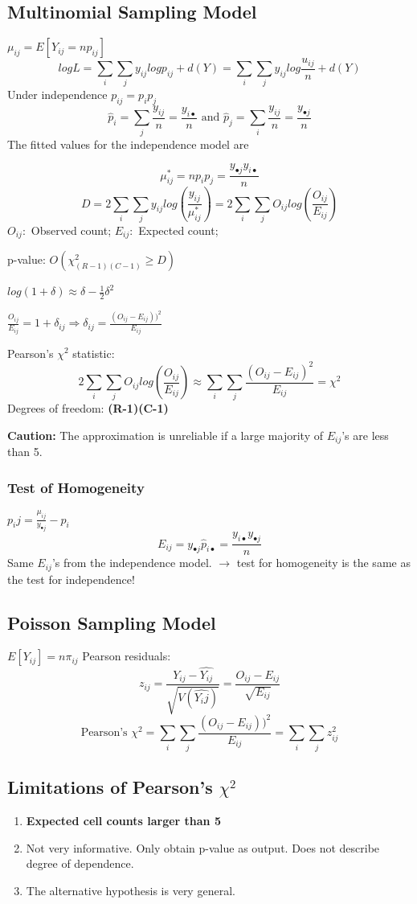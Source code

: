 \documentclass[10pt,landscape, fleqn]{article}
\begin{document}
\begin{multicols}{3}
			\subsection{Multinomial Sampling Model}
				$\mu_{ij} = E[Y_{ij} = np_{ij}]$
				\[ logL = \sum_{i}\sum_{j}y_{ij}log p_{ij} + d(Y) = \sum_{i}\sum_{j}y_{ij}log \frac{u_{ij}}{n} + d(Y)\]
				Under independence $p_{ij} = p_ip_j$
				\[\hat{p}_i = \sum_{j}\frac{y_{ij}}{n} = \frac{y_{i\bullet}}{n} \mbox{ and } \hat{p}_j = \sum_{i}\frac{y_{ij}}{n} = \frac{y_{\bullet j}}{n} \]
				The fitted values for the independence model are \par
				\[ \mu^*_{ij} = np_ip_j = \frac{y_{\bullet j}y_{i\bullet}}{n} \]
				\[ D = 2\sum_{i}\sum_{j}y_{ij}log(\frac{y_{ij}}{\mu^*_{ij}}) = 2\sum_{i}\sum_{j}O_{ij}log(\frac{O_{ij}}{E_{ij}}) \]
				$O_{ij}: $ Observed count; $E_{ij}: $ Expected count; \par 
				p-value: $O(\chi^2_{(R-1)(C-1)} \geq D)$ \par 
				$log(1+\delta) \approx \delta- \frac{1}{2}\delta^2$ \par 
				$\frac{O_{ij}}{E_{ij}} = 1 + \delta_{ij} \Rightarrow \delta_{ij} = \frac{(O_{ij}-E_{ij}))^2}{E_{ij}}$\par
				Pearson's $\chi^2$ statistic:
				\[ 2\sum_{i}\sum_{j}O_{ij}log(\frac{O_{ij}}{E_{ij}}) \approx \sum_{i}\sum_{j}\frac{(O_{ij}-E_{ij})^2}{E_{ij}} = \chi^2 \]
				Degrees of freedom: \textbf{(R-1)(C-1)} \par 
				\textbf{Caution: } The approximation is unreliable if a large majority of $E_{ij}$'s are less than 5.
				\subsubsection{Test of Homogeneity}
					$  p_ij = \frac{\mu_{ij}}{y_{\bullet j}} - p_{i} $
					\[ E_{ij} = y_{\bullet j} \hat{p}_{i\bullet} = \frac{y_{i\bullet}y_{\bullet j}}{n} \]
					Same $E_{ij}$'s from the independence model. $\rightarrow$ test for homogeneity is the same as the test for independence!
			\subsection{Poisson Sampling Model}
				$E[Y_{ij}] = n\pi_{ij}$
				Pearson residuals:
				\[ z_{ij} = \frac{Y_{ij}-\hat{Y_{ij}}}{\sqrt{V(\hat{Y_ij})}} = \frac{O_{ij} - E_{ij}}{\sqrt{E_{ij}}} \]
				\[ \mbox{Pearson's }\chi^2 = \sum_{i}\sum_{j}\frac{(O_{ij}-E_{ij}))^2}{E_{ij}} = \sum_{i}\sum_{j}z_{ij}^2  \]
			\subsection{Limitations of Pearson's $\chi^2$}
				\begin{enumerate}
					\item \textbf{Expected cell counts larger than 5}
					\item Not very informative. Only obtain p-value as output. Does not describe degree of dependence.
					\item The alternative hypothesis is very general.
				\end{enumerate}

\end{multicols}
\end{document}
